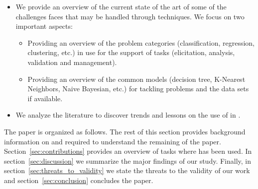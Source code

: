\begin{itemize}
    \item We provide an overview of the current state of the art of some of the
    challenges \RE faces that may be handled through \ML techniques. We focus on
    two important aspects:
    \begin{itemize}
        \item Providing an overview of the \ML problem categories
        (classification, regression, clustering, etc.) in use for the support of
        \RE tasks (elicitation, analysis, validation and management).
        \item Providing an overview of the common \ML models (decision tree,
        K-Nearest Neighbors, Naive Bayesian, etc.) for tackling \RE problems and
        the data sets if available.
    \end{itemize}
    \item We analyze the literature to discover trends and lessons on the use of \ML in \RE.
\end{itemize}
The paper is organized as follows. The rest of this section provides
background information on \ML and \RE required to understand the remaining of
the paper. Section~\ref{sec:contributions} provides an overview of \RE tasks
where \ML has been used. In section~\ref{sec:discussion} we summarize the major
findings of our study. Finally, in section~\ref{sec:threats_to_validity} we
state the threats to the validity of our work and section~\ref{sec:conclusion}
concludes the paper.


